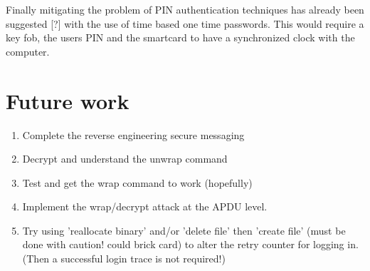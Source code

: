 \documentclass[bsc,frontabs,twoside,singlespacing,parskip,deptreport]{infthesis}     %
\begin{document}
Finally mitigating the problem of PIN authentication techniques has already been suggested [?] with the use of time based one time passwords. This would require a key fob, the users PIN and the smartcard to have a synchronized clock with the computer. 

\chapter{Future work}

\begin{enumerate}
\item Complete the reverse engineering secure messaging
\item Decrypt and understand the unwrap command
\item Test and get the wrap command to work (hopefully)
\item Implement the wrap/decrypt attack at the APDU level.

\item Try using 'reallocate binary' and/or 'delete file' then 'create file' (must be done with caution! could brick card) to alter the retry counter for logging in. (Then a successful login trace is not required!)
\end{enumerate}
\end{document}
